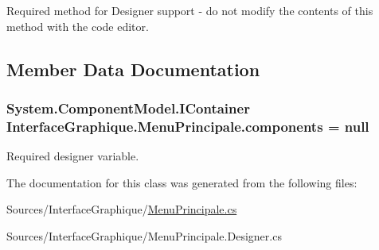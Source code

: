 Required method for Designer support -\/ do not modify the contents of this method with the code editor. 



\subsection{Member Data Documentation}
\subsubsection[{\texorpdfstring{components}{components}}]{\setlength{\rightskip}{0pt plus 5cm}System.\+Component\+Model.\+I\+Container Interface\+Graphique.\+Menu\+Principale.\+components = null\hspace{0.3cm}{\ttfamily [private]}}\hypertarget{class_interface_graphique_1_1_menu_principale_a55dedbb7f06ab4f0c703b5a69753ab20}{}\label{class_interface_graphique_1_1_menu_principale_a55dedbb7f06ab4f0c703b5a69753ab20}


Required designer variable. 



The documentation for this class was generated from the following files\+:\begin{DoxyCompactItemize}
\item 
Sources/\+Interface\+Graphique/\hyperlink{_menu_principale_8cs}{Menu\+Principale.\+cs}\item 
Sources/\+Interface\+Graphique/Menu\+Principale.\+Designer.\+cs\end{DoxyCompactItemize}
